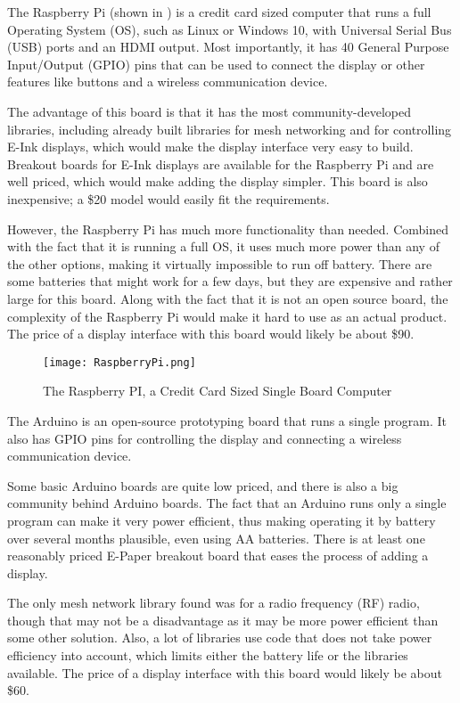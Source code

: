 \documentclass[PPFS.tex]{template/subfiles}
\begin{document}
The Raspberry Pi (shown in ) is a credit card sized computer that runs a full Operating System (OS), such as Linux or Windows 10, with Universal Serial Bus (USB) ports and an HDMI output. Most importantly, it has 40 General Purpose Input/Output (GPIO) pins that can be used to connect the display or other features like buttons and a wireless communication device.

The advantage of this board is that it has the most community-developed libraries, including already built libraries for mesh networking and for controlling E-Ink displays, which would make the display interface very easy to build. Breakout boards for E-Ink displays are available for the Raspberry Pi and are well priced, which would make adding the display simpler. This board is also inexpensive; a \$20 model would easily fit the requirements.

However, the Raspberry Pi has much more functionality than needed. Combined with the fact that it is running a full OS, it uses much more power than any of the other options, making it virtually impossible to run off battery. There are some batteries that might work for a few days, but they are expensive and rather large for this board. Along with the fact that it is not an open source board, the complexity of the Raspberry Pi would make it hard to use as an actual product. The price of a display interface with this board would likely be about \$90.

\begin{figure}[h]
	\centering
	\texttt{[image: RaspberryPi.png]}
	\caption{The Raspberry PI, a Credit Card Sized Single Board Computer}
	\label{fig:raspberryPi}
\end{figure}

The Arduino is an open-source prototyping board that runs a single program. It also has GPIO pins for controlling the display and connecting a wireless communication device.

Some basic Arduino boards are quite low priced, and there is also a big community behind Arduino boards. The fact that an Arduino runs only a single program can make it very power efficient, thus making operating it by battery over several months plausible, even using AA batteries. There is at least one reasonably priced E-Paper breakout board that eases the process of adding a display.

The only mesh network library found was for a radio frequency (RF) radio, though that may not be a disadvantage as it may be more power efficient than some other solution. Also, a lot of libraries use code that does not take power efficiency into account, which limits either the battery life or the libraries available. The price of a display interface with this board would likely be about \$60.
\end{document}
